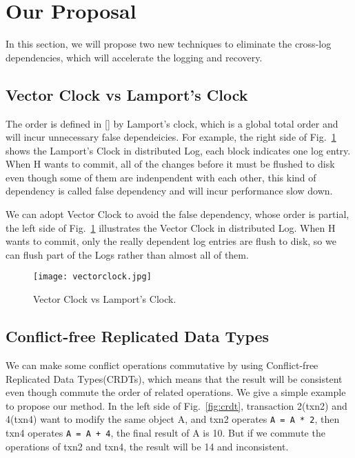 \section{Our Proposal}
In this section, we will propose two new techniques to eliminate the cross-log dependencies, which will accelerate the logging and recovery.
\subsection{Vector Clock vs Lamport's Clock}
The order is defined in [] by Lamport's clock, which is a global total order and will incur unnecessary false dependeicies. For example, the right side of Fig.~\ref{fig:vectorclock} shows the Lamport's Clock in distributed Log, each block indicates one log entry. When H wants to commit, all of the changes before it must be flushed to disk even though some of them are indenpendent with each other, this kind of dependency is called false dependency and will incur performance slow down.

We can adopt Vector Clock to avoid the false dependency, whose order is partial, the left side of Fig.~\ref{fig:vectorclock} illustrates the Vector Clock in distributed Log. When H wants to commit, only the really dependent log entries are flush to disk, so we can flush part of the Logs rather than almost all of them.
\begin{figure}[htbp]
  \centering
  \texttt{[image: vectorclock.jpg]}\\
  \caption{Vector Clock vs Lamport's Clock.}\label{fig:vectorclock}
\end{figure}

\subsection{Conflict-free Replicated Data Types}
We can make some conflict operations commutative by using Conflict-free Replicated Data Types(CRDTs), which means that the result will be consistent even though commute the order of related operations. We give a simple example to propose our method. In the left side of Fig.~\ref{fig:crdt}, transaction 2(txn2) and 4(txn4) want to modify the same object A, and txn2 operates \texttt{A = A * 2}, then txn4 operates \texttt{A = A + 4}, the final result of A is 10. But if we commute the operations of txn2 and txn4, the result will be 14 and inconsistent. 

